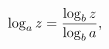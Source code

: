 \[\mathop{\mathrm{log}_{a}\/}\nolimits z=\frac{\mathop{\mathrm{log}_{b}\/}%
\nolimits z}{\mathop{\mathrm{log}_{b}\/}\nolimits a},\]
